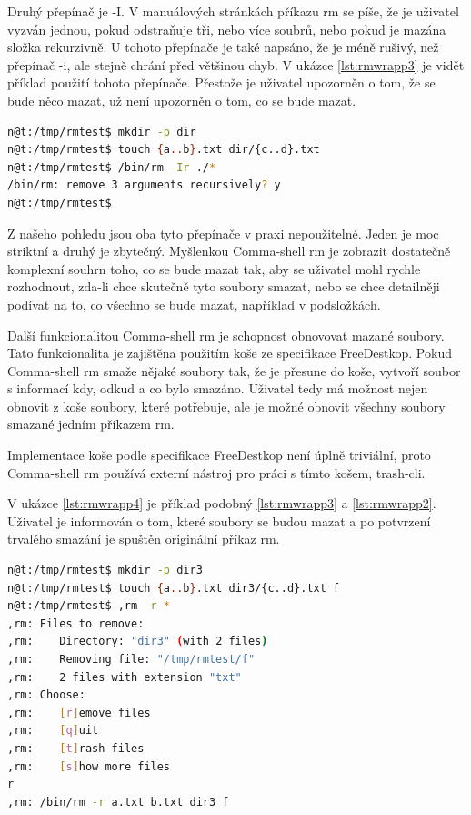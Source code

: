 \documentclass[thesis=M,czech]{FITthesis}[2012/06/26]
\begin{document}
Druhý přepínač je -I. V manuálových stránkách příkazu rm se píše, že je uživatel vyzván jednou, pokud odstraňuje tři, nebo více soubrů, nebo pokud je mazána složka rekurzivně. U tohoto přepínače je také napsáno, že je méně rušivý, než přepínač -i, ale stejně chrání před většinou chyb. V ukázce \ref{lst:rmwrapp3} je vidět příklad použití tohoto přepínače. Přestože je uživatel upozorněn o tom, že se bude něco mazat, už není upozorněn o tom, co se bude mazat.

\begin{minipage}{\linewidth}
\begin{lstlisting}[language=bash, caption={rm s }, label={lst:rmwrapp3}]
n@t:/tmp/rmtest$ mkdir -p dir
n@t:/tmp/rmtest$ touch {a..b}.txt dir/{c..d}.txt
n@t:/tmp/rmtest$ /bin/rm -Ir ./*
/bin/rm: remove 3 arguments recursively? y
n@t:/tmp/rmtest$ 
\end{lstlisting}
\end{minipage}

Z našeho pohledu jsou oba tyto přepínače v praxi nepoužitelné. Jeden je moc striktní a druhý je zbytečný. Myšlenkou Comma-shell rm je zobrazit dostatečně komplexní souhrn toho, co se bude mazat tak, aby se uživatel mohl rychle rozhodnout, zda-li chce skutečně tyto soubory smazat, nebo se chce detailněji podívat na to, co všechno se bude mazat, například v podsložkách.

Další funkcionalitou Comma-shell rm je schopnost obnovovat mazané soubory. Tato funkcionalita je zajištěna použitím koše ze specifikace FreeDestkop. Pokud Comma-shell rm smaže nějaké soubory tak, že je přesune do koše, vytvoří soubor s informací kdy, odkud a co bylo smazáno. Uživatel tedy má možnost nejen obnovit z koše soubory, které potřebuje, ale je možné obnovit všechny soubory smazané jedním příkazem rm.

Implementace koše podle specifikace FreeDestkop není úplně triviální, proto Comma-shell rm používá externí nástroj pro práci s tímto košem, trash-cli.


V ukázce \ref{lst:rmwrapp4} je příklad podobný \ref{lst:rmwrapp3} a \ref{lst:rmwrapp2}. Uživatel je informován o tom, které soubory se budou mazat a po potvrzení trvalého smazání je spuštěn originální příkaz rm.

\begin{minipage}{\linewidth}
\begin{lstlisting}[language=bash, caption={rm s }, label={lst:rmwrapp4}]
n@t:/tmp/rmtest$ mkdir -p dir3
n@t:/tmp/rmtest$ touch {a..b}.txt dir3/{c..d}.txt f
n@t:/tmp/rmtest$ ,rm -r *
,rm: Files to remove:
,rm:    Directory: "dir3" (with 2 files)
,rm:    Removing file: "/tmp/rmtest/f"
,rm:    2 files with extension "txt"
,rm: Choose:
,rm:    [r]emove files
,rm:    [q]uit
,rm:    [t]rash files
,rm:    [s]how more files
r
,rm: /bin/rm -r a.txt b.txt dir3 f
\end{lstlisting}
\end{minipage}
\end{document}
